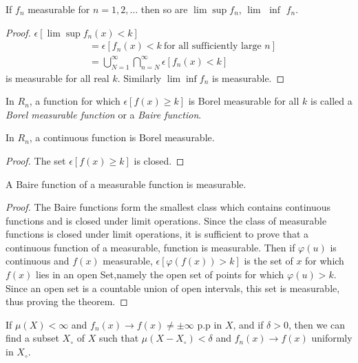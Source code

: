 \begin{theorem}\label{chap1:sec10:thm15} 
  If $f_n$ measurable for $n=1,2,\ldots$ then so are $\lim \sup f_n$,
  $\lim$ $\inf$  $f_n$.
\end{theorem}

\begin{proof}
  $\epsilon [\lim \sup  f_n(x) < k]$
  \begin{align*}
    &=\epsilon[f_n(x)< k ~\text{for all sufficiently large $n$}]\\
    &=\bigcup^{\infty}_{N=1} \bigcap^{\infty}_{n=N} \epsilon[f_n(x)< k] 
  \end{align*}
  is measurable for all real $k$. Similarly  $\lim \inf f_n$ is measurable.
\end{proof}

In $R_n$, a function for which $\epsilon[f(x)\geq k]$ is Borel
measurable for all $k$ is called a \textit{Borel measurable function} or a \textit{Baire
function}.
 
\begin{theorem}\label{chap1:sec10:thm16} 
In $R_n$, a continuous function is Borel measurable.
\end{theorem}
\begin{proof} 
The set $\epsilon[f(x)\geq k]$ is closed.
\end{proof}

\begin{theorem}\label{chap1:sec10:thm17} 
 A Baire function of a measurable function is measurable.
\end{theorem}

\begin{proof}
  The Baire functions form the smallest class which contains continuous
  functions and is closed under limit operations. 
  Since the class of measurable functions is closed under limit
  operations, it is sufficient to prove that a continuous function of a
  measurable, 
  function is measurable. Then if $\varphi (u)$ is continuous and $f(x)$
  measurable, $\epsilon [\varphi(f(x))> k]$ is the set of $x$ for which
  $f(x)$ lies in an open 
  Set,\pageoriginale namely the open set of points for which $\varphi(u)>k.$ Since an
  open set is a countable union of open intervals, this set is
  measurable, thus proving the theorem. 
\end{proof}

\begin{theorem}[Egoroff]\label{chap1:sec10:thm18} 
  If $\mu(X)< \infty$ and $f_n(x)\rightarrow f(x) \neq \pm
  \infty$   p.p in $X$, and if $\delta>0$, then we can find a subset
  $X_\circ$ of $X$ such that $\mu(X-X_\circ) <\delta$ and $f_n(x)
  \rightarrow f(x)$ uniformly in $X_\circ$. 
\end{theorem}

